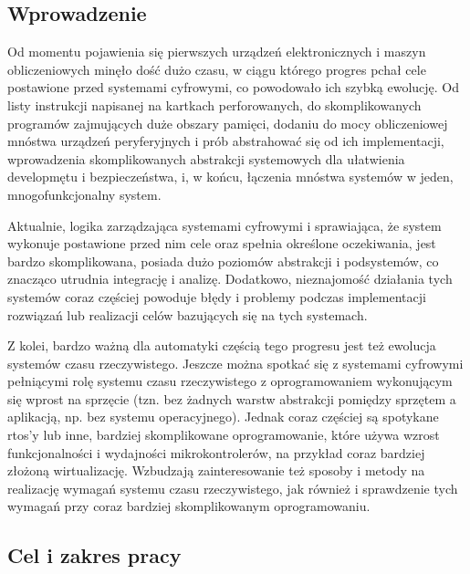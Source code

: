 \documentclass[../../main]{subfiles}
\begin{document}
\subsection{Wprowadzenie}

Od momentu pojawienia się pierwszych urządzeń elektronicznych i maszyn %
obliczeniowych minęło dość dużo czasu, w ciągu którego progres pchał cele %
postawione przed systemami cyfrowymi, co powodowało ich szybką ewolucję. Od listy instrukcji napisanej
na kartkach perforowanych, do skomplikowanych programów zajmujących duże obszary pamięci, dodaniu do
mocy obliczeniowej mnóstwa urządzeń peryferyjnych i prób abstrahować się od ich implementacji,
wprowadzenia skomplikowanych abstrakcji systemowych dla ułatwienia developmętu i %
bezpieczeństwa, i, w końcu, łączenia mnóstwa systemów w jeden, mnogofunkcjonalny system.

Aktualnie, logika zarządzająca systemami cyfrowymi i sprawiająca, że system wykonuje postawione przed
nim cele oraz spełnia określone oczekiwania, jest bardzo skomplikowana, posiada dużo poziomów
abstrakcji i podsystemów, co znacząco utrudnia integrację i analizę. Dodatkowo, nieznajomość działania
tych systemów coraz częściej powoduje błędy i problemy podczas %
implementacji rozwiązań lub realizacji celów bazujących się na tych systemach.

Z kolei, bardzo ważną dla automatyki częścią tego progresu jest też ewolucja systemów czasu
rzeczywistego. Jeszcze można spotkać się z systemami cyfrowymi pełniącymi rolę systemu czasu
rzeczywistego z oprogramowaniem wykonującym się wprost na sprzęcie (tzn. bez żadnych warstw abstrakcji
pomiędzy sprzętem a aplikacją, np. bez systemu operacyjnego). Jednak coraz częściej są spotykane
\acrshort{rtos}'y lub inne, bardziej skomplikowane oprogramowanie, które używa wzrost funkcjonalności i
wydajności mikrokontrolerów, na przykład coraz bardziej złożoną wirtualizację. %
Wzbudzają zainteresowanie też sposoby i metody na realizację wymagań systemu czasu rzeczywistego, jak
również i sprawdzenie tych wymagań przy coraz bardziej skomplikowanym oprogramowaniu.

\subsection{Cel i zakres pracy}
\end{document}
